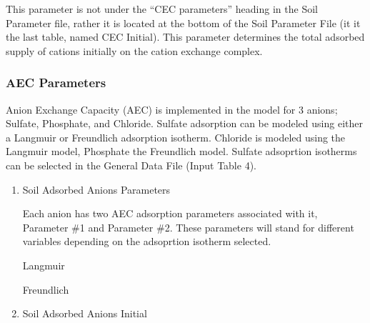 \documentclass[
]{article}
\begin{document}
\begin{enumerate}
  This parameter is not under the ``CEC parameters'' heading in the Soil
  Parameter file, rather it is located at the bottom of the Soil
  Parameter File (it it the last table, named CEC Initial). This
  parameter determines the total adsorbed supply of cations initially on
  the cation exchange complex.

  \hypertarget{aec-parameters}{%
  \subsubsection{AEC Parameters}\label{aec-parameters}}

  Anion Exchange Capacity (AEC) is implemented in the model for 3
  anions; Sulfate, Phosphate, and Chloride. Sulfate adsorption can be
  modeled using either a Langmuir or Freundlich adsorption isotherm.
  Chloride is modeled using the Langmuir model, Phosphate the Freundlich
  model. Sulfate adsoprtion isotherms can be selected in the General
  Data File (Input Table 4).

  \begin{enumerate}
  \def\labelenumii{\arabic{enumii}.}
  \item
    Soil Adsorbed Anions Parameters

    Each anion has two AEC adsorption parameters associated with it,
    Parameter \#1 and Parameter \#2. These parameters will stand for
    different variables depending on the adsoprtion isotherm selected.

    Langmuir

    Freundlich
  \item
    Soil Adsorbed Anions Initial
  \end{enumerate}
\end{enumerate}
\end{document}
